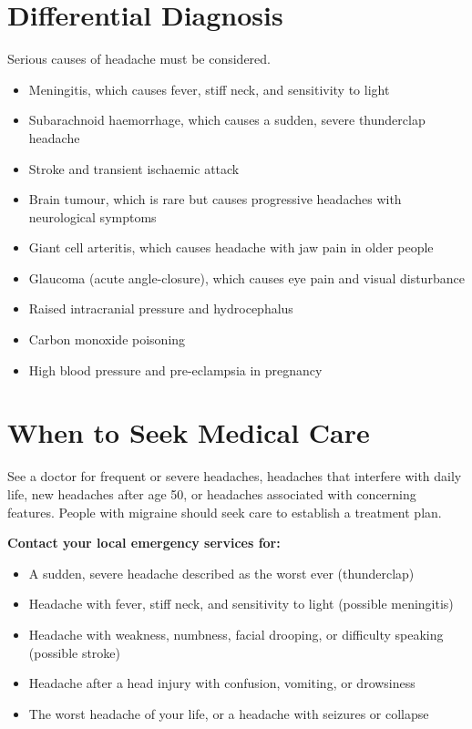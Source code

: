 \section*{Differential Diagnosis}
Serious causes of headache must be considered.

\begin{itemize}
    \item Meningitis, which causes fever, stiff neck, and sensitivity to light
    \item Subarachnoid haemorrhage, which causes a sudden, severe thunderclap headache
    \item Stroke and transient ischaemic attack
    \item Brain tumour, which is rare but causes progressive headaches with neurological symptoms
    \item Giant cell arteritis, which causes headache with jaw pain in older people
    \item Glaucoma (acute angle-closure), which causes eye pain and visual disturbance
    \item Raised intracranial pressure and hydrocephalus
    \item Carbon monoxide poisoning
    \item High blood pressure and pre-eclampsia in pregnancy
\end{itemize}

\section*{When to Seek Medical Care}
See a doctor for frequent or severe headaches, headaches that interfere with daily life, new headaches after age 50, or headaches associated with concerning features. People with migraine should seek care to establish a treatment plan.

\textbf{Contact your local emergency services for:}
\begin{itemize}
    \item A sudden, severe headache described as the worst ever (thunderclap)
    \item Headache with fever, stiff neck, and sensitivity to light (possible meningitis)
    \item Headache with weakness, numbness, facial drooping, or difficulty speaking (possible stroke)
    \item Headache after a head injury with confusion, vomiting, or drowsiness
    \item The worst headache of your life, or a headache with seizures or collapse
\end{itemize}

